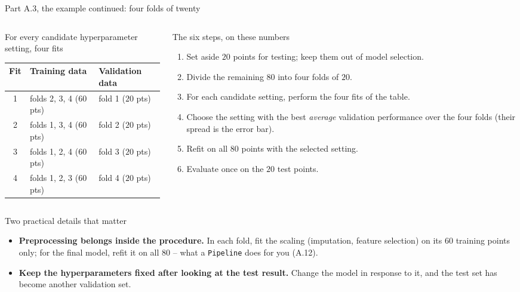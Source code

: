 \documentclass[10pt,aspectratio=169]{beamer}
\begin{document}
\begin{frame}{Part A.3, the example continued: four folds of twenty}
\footnotesize
\begin{columns}[T]
\begin{column}{0.46\textwidth}
\begin{block}{For every candidate hyperparameter setting, four fits}
\centering
\begin{tabular}{@{}cll@{}}
\toprule
Fit & Training data & Validation data \\
\midrule
1 & folds 2, 3, 4 ($60$ pts) & fold 1 ($20$ pts) \\
2 & folds 1, 3, 4 ($60$ pts) & fold 2 ($20$ pts) \\
3 & folds 1, 2, 4 ($60$ pts) & fold 3 ($20$ pts) \\
4 & folds 1, 2, 3 ($60$ pts) & fold 4 ($20$ pts) \\
\bottomrule
\end{tabular}
\end{block}
\end{column}
\begin{column}{0.52\textwidth}
\begin{block}{The six steps, on these numbers}
\begin{enumerate}
  \item Set aside $20$ points for testing; keep them out of model selection.
  \item Divide the remaining $80$ into four folds of $20$.
  \item For each candidate setting, perform the four fits of the table.
  \item Choose the setting with the best \emph{average} validation
        performance over the four folds (their spread is the error bar).
  \item Refit on all $80$ points with the selected setting.
  \item Evaluate once on the $20$ test points.
\end{enumerate}
\end{block}
\end{column}
\end{columns}
\medskip
\begin{block}{Two practical details that matter}
\begin{itemize}
  \item \textbf{Preprocessing belongs inside the procedure.}  In each fold,
        fit the scaling (imputation, feature selection) on its $60$ training
        points only; for the final model, refit it on all $80$ -- what a
        \texttt{Pipeline} does for you (A.12).
  \item \textbf{Keep the hyperparameters fixed after looking at the test
        result.}  Change the model in response to it, and the test set has
        become another validation set.
\end{itemize}
\end{block}
\end{frame}
\end{document}
